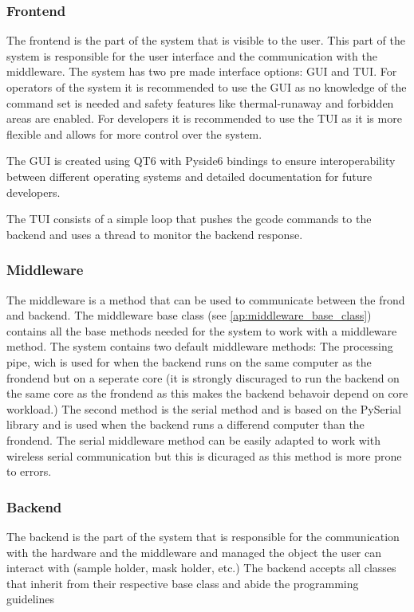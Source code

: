 \documentclass[11pt]{article}
\begin{document}
\subsubsection{Frontend}
The frontend is the part of the system that is visible to the user.
This part of the system is responsible for the user interface and the communication with the middleware.
The system has two pre made interface options: GUI and TUI.
For operators of the system it is recommended to use the GUI as no knowledge of the command set is needed and safety features like thermal-runaway and forbidden areas are enabled.
For developers it is recommended to use the TUI as it is more flexible and allows for more control over the system.

The GUI is created using QT6 with Pyside6 bindings  to ensure interoperability between different operating systems and detailed documentation for future developers.

The TUI consists of a simple loop that pushes the gcode commands to the backend and uses a thread to monitor the backend response.

\subsubsection{Middleware}
The middleware is a method that can be used to communicate between the frond and backend. 
The middleware base class (see \ref{ap:middleware_base_class}) contains all the base methods needed for the system to work with a middleware method.
The system contains two default middleware methods: The processing pipe, wich is used for when the backend runs on the same computer as the frondend but on a seperate core (it is strongly discuraged to run the backend on the same core as the frondend as this makes the backend behavoir depend on core workload.) 
The second method is the serial method and is based on the PySerial library  and is used when the backend runs a differend computer than the frondend.
The serial middleware method can be easily adapted to work with wireless serial communication but this is dicuraged as this method is more prone to errors.

\subsubsection{Backend}
The backend is the part of the system that is responsible for the communication with the hardware and the middleware and managed the object the user can interact with (sample holder, mask holder, etc.)
The backend accepts all classes that inherit from their respective base class and abide the programming guidelines 
\end{document}
